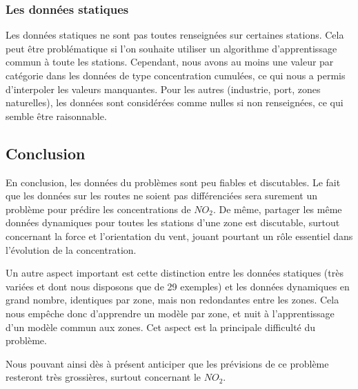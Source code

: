 \subsubsection{Les données statiques}

Les données statiques ne sont pas toutes renseignées sur certaines stations. Cela peut être problématique si l'on souhaite utiliser un algorithme d'apprentissage commun à toute les stations. Cependant, nous avons au moins une valeur par catégorie dans les données de type concentration cumulées, ce qui nous a permis d'interpoler les valeurs manquantes. Pour les autres (industrie, port, zones naturelles), les données sont considérées comme nulles si non renseignées, ce qui semble être raisonnable.


\subsection{Conclusion}

En conclusion, les données du problèmes sont peu fiables et discutables. Le fait que les données sur les routes ne soient pas différenciées sera surement un problème pour prédire les concentrations de $NO_2$. De même, partager les même données dynamiques pour toutes les stations d'une zone est discutable, surtout concernant la force et l'orientation du vent, jouant pourtant un rôle essentiel dans l'évolution de la concentration.

Un autre aspect important est cette distinction entre les données statiques (très variées et dont nous disposons que de 29 exemples) et les données dynamiques en grand nombre, identiques par zone, mais non redondantes entre les zones. Cela nous empêche donc d'apprendre un modèle par zone, et nuit à l'apprentissage d'un modèle commun aux zones. Cet aspect est la principale difficulté du problème.  

Nous pouvant ainsi dès à présent anticiper que les prévisions de ce problème resteront très grossières, surtout concernant le $NO_2$.

